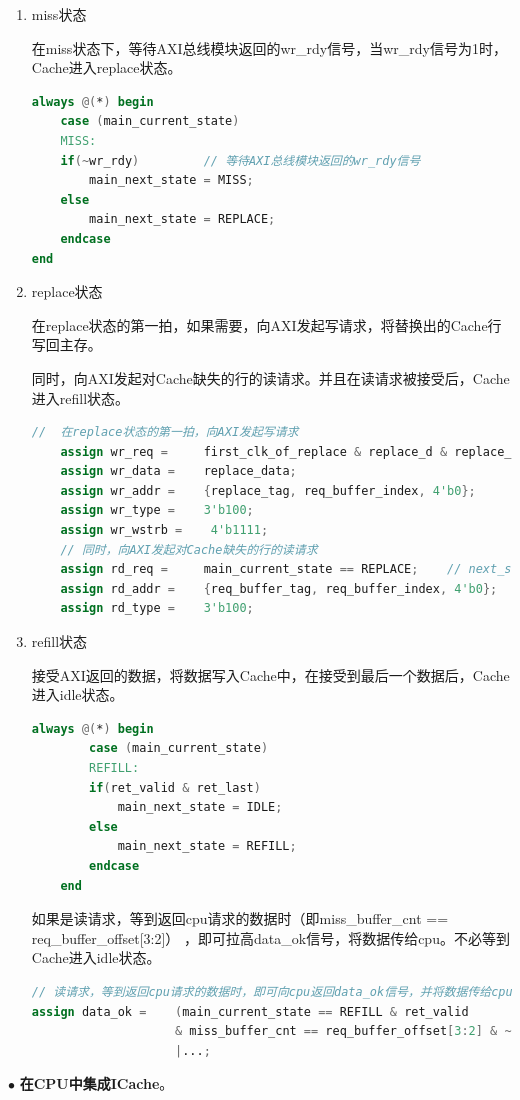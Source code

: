 \documentclass[11pt]{article}
\begin{document}
\begin{enumerate}
\begin{enumerate}
\item miss状态

在miss状态下，等待AXI总线模块返回的wr\_rdy信号，当wr\_rdy信号为1时，Cache进入replace状态。
\begin{lstlisting}[language=verilog]
always @(*) begin
    case (main_current_state)
    MISS:
    if(~wr_rdy)         // 等待AXI总线模块返回的wr_rdy信号
        main_next_state = MISS;
    else
        main_next_state = REPLACE;
    endcase
end
\end{lstlisting}
\item replace状态

在replace状态的第一拍，如果需要，向AXI发起写请求，将替换出的Cache行写回主存。

同时，向AXI发起对Cache缺失的行的读请求。并且在读请求被接受后，Cache进入refill状态。
\begin{lstlisting}[language=verilog]
    //  在replace状态的第一拍，向AXI发起写请求
    assign wr_req =     first_clk_of_replace & replace_d & replace_v;
    assign wr_data =    replace_data;
    assign wr_addr =    {replace_tag, req_buffer_index, 4'b0};
    assign wr_type =    3'b100;
    assign wr_wstrb =    4'b1111;
    // 同时，向AXI发起对Cache缺失的行的读请求
    assign rd_req =     main_current_state == REPLACE;    // next_state == replace
    assign rd_addr =    {req_buffer_tag, req_buffer_index, 4'b0};
    assign rd_type =    3'b100;
\end{lstlisting}


\item refill状态

接受AXI返回的数据，将数据写入Cache中，在接受到最后一个数据后，Cache进入idle状态。
\begin{lstlisting}[language=verilog]
    always @(*) begin
        case (main_current_state)
        REFILL:
        if(ret_valid & ret_last)
            main_next_state = IDLE;
        else
            main_next_state = REFILL;
        endcase
    end
    \end{lstlisting}
如果是读请求，等到返回cpu请求的数据时（即miss\_buffer\_cnt == req_buffer_offset[3:2]）
，即可拉高data\_ok信号，将数据传给cpu。不必等到Cache进入idle状态。
\begin{lstlisting}[language=verilog]
// 读请求，等到返回cpu请求的数据时，即可向cpu返回data_ok信号，并将数据传给cpu
assign data_ok =    (main_current_state == REFILL & ret_valid 
                    & miss_buffer_cnt == req_buffer_offset[3:2] & ~req_buffer_op)
                    |...;
\end{lstlisting}
\end{enumerate}
    
\end{enumerate}
$\bullet$
\textbf{在CPU中集成ICache}。
\end{document}
